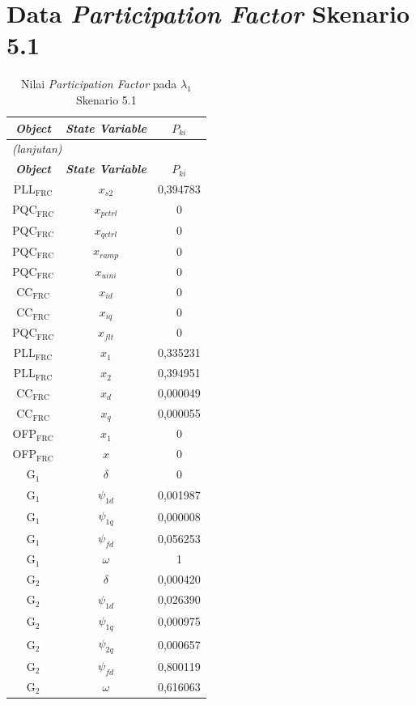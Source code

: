 \section{Data \textit{Participation Factor} Skenario 5.1}
\begingroup
\fontsize{12}{14.4}\selectfont
\setlength{\tabcolsep}{8pt}
\begin{longtable}{c c c} \caption[]{Nilai
	\textit{Participation Factor} pada $\lambda_1$ Skenario 5.1}
	\label{tab:prf_sk51_lampiran} \\
	\toprule
	\multicolumn{1}{c}{\textbf{\textit{Object}}} & \textbf{\textit{State
	Variable}} & \textbf{$P_{ki}$} \\
	\midrule
	\endfirsthead
	\multicolumn{3}{l}{\textit{(lanjutan)}} \\
	\toprule
	\multicolumn{1}{c}{\textbf{\textit{Object}}} & \textbf{\textit{State
	Variable}} & \textbf{$P_{ki}$} \\
	\midrule
	\endhead
	\bottomrule
	\endfoot
	PLL$_\text{FRC}$ & $x_{s2}$ & 0,394783  \\
	PQC$_\text{FRC}$ & $x_{pctrl}$ & 0         \\
	PQC$_\text{FRC}$ & $x_{qctrl}$ & 0         \\
	PQC$_\text{FRC}$ & $x_{ramp}$ & 0         \\
	PQC$_\text{FRC}$ & $x_{uini}$ & 0         \\
	CC$_\text{FRC}$ & $x_{id}$ & 0         \\
	CC$_\text{FRC}$ & $x_{iq}$ & 0         \\
	PQC$_\text{FRC}$ & $x_{flt}$ & 0         \\
	PLL$_\text{FRC}$ & $x_1$ & 0,335231  \\
	PLL$_\text{FRC}$ & $x_2$ & 0,394951  \\
	CC$_\text{FRC}$ & $x_d$ & 0,000049  \\
	CC$_\text{FRC}$ & $x_q$ & 0,000055  \\
	OFP$_\text{FRC}$ & $x_1$ & 0         \\
	OFP$_\text{FRC}$ & $x$ & 0         \\
	G$_1$ & $\delta$ & 0         \\
	G$_1$ & $\psi_{1d}$ & 0,001987  \\
	G$_1$ & $\psi_{1q}$ & 0,000008  \\
	G$_1$ & $\psi_{fd}$ & 0,056253  \\
	G$_1$ & $\omega$ & 1         \\
	G$_2$ & $\delta$ & 0,000420  \\
	G$_2$ & $\psi_{1d}$ & 0,026390  \\
	G$_2$ & $\psi_{1q}$ & 0,000975  \\
	G$_2$ & $\psi_{2q}$ & 0,000657  \\
	G$_2$ & $\psi_{fd}$ & 0,800119  \\
	G$_2$ & $\omega$ & 0,616063  \\
\end{longtable}
\par
\endgroup

